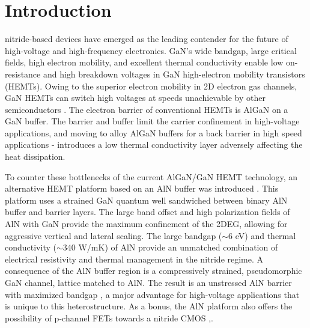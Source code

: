 \documentclass[journal]{IEEEtran}
\begin{document}
%
\IEEEpeerreviewmaketitle
\section{Introduction}
 nitride-based devices have emerged as the leading contender for the future of high-voltage and high-frequency electronics. GaN's wide bandgap, large critical fields, high electron mobility, and excellent thermal conductivity enable low on-resistance and high breakdown voltages in GaN high-electron mobility transistors (HEMTs). Owing to the superior electron mobility in 2D electron gas channels, GaN HEMTs can switch high voltages at speeds unachievable by other semiconductors \cite{b1}. The electron barrier of conventional HEMTs is AlGaN on a GaN buffer. The barrier and buffer limit the carrier confinement in high-voltage applications, and moving to alloy AlGaN buffers for a back barrier in high speed applications \cite{b12}-\cite{b15} introduces a low thermal conductivity layer adversely affecting the heat dissipation.

To counter these bottlenecks of the current AlGaN/GaN HEMT technology, an alternative HEMT platform based on an AlN buffer was introduced \cite{b4}. This platform uses a strained GaN quantum well sandwiched between binary AlN buffer and barrier layers. The large band offset and high polarization fields of AlN with GaN provide the maximum confinement of the 2DEG, allowing for aggressive vertical and lateral scaling. The large bandgap ($\sim$6 eV) and thermal conductivity ($\sim$340 W/mK) \cite{b2} of AlN provide an unmatched combination of electrical resistivity and thermal management in the nitride regime. A consequence of the AlN buffer region is a compressively strained, pseudomorphic GaN channel, lattice matched to AlN. The result is an unstressed AlN barrier with maximized bandgap \textcolor{red}{\cite{b3}}, a major advantage for high-voltage applications that is unique to this heterostructure. As a bonus, the AlN platform also offers the possibility of p-channel FETs towards a nitride CMOS \cite{b7},\cite{b8}.
\end{document}
